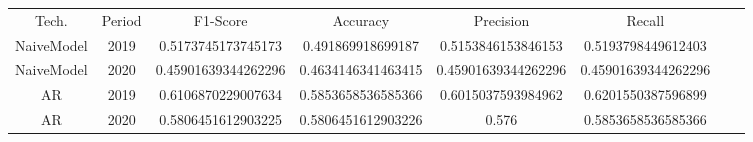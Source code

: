 \begin{appendices}
\begin{table}[H]
\scriptsize
\setlength\extrarowheight{3pt}
\centering
\caption{Resultados categóricos de todos os experimentos para os testes com os Modelos \textit{Naive} e AR. Ações PETR4.SA.}
\begin{longtable}{ccccccll}
\cline{1-6}
Tech. & Period & F1-Score & Accuracy & Precision & Recall &  &  \\ \cline{1-6}
NaiveModel & 2019 & 0.5173745173745173 & 0.491869918699187 & 0.5153846153846153 & 0.5193798449612403 &  &  \\
NaiveModel & 2020 & 0.45901639344262296 & 0.4634146341463415 & 0.45901639344262296 & 0.45901639344262296 &  &  \\
AR & 2019 & 0.6106870229007634 & 0.5853658536585366 & 0.6015037593984962 & 0.6201550387596899 &  &  \\
AR & 2020 & 0.5806451612903225 & 0.5806451612903226 & 0.576 & 0.5853658536585366 &  &  \\ \cline{1-6}
\end{longtable}
\end{table}


\thispagestyle{empty}



\end{appendices}
